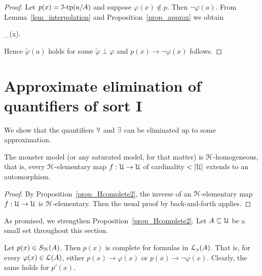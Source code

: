 \documentclass[10pt,oneside]{amsproc}
\begin{document}
 \begin{proof}
  Let $p(x)={\EuScript I}\mbox{-tp}(a/A)$ and suppose $\varphi(x)\notin p$.
  Then $\neg\varphi(a)$.
  From Lemma~\ref{lem_interpolation} and Proposition~\ref{prop_approx} we obtain

  {\rightarrow}
  {\bigvee_{\tilde{\varphi}\perp\varphi}\tilde{\varphi}(x).}

  Hence $\tilde{\varphi}(a)$ holds for some $\tilde{\varphi}\perp\varphi$ and $p(x)\rightarrow\neg\varphi(x)$ follows.
 \end{proof}








\section{Approximate elimination of quantifiers of sort \textsf{I}}

We show that the quantifiers $\forall $ and $\exists $ can be eliminated up to some approximation.

\begin{proposition}
  The monster model (or any saturated model, for that matter) is ${\EuScript H}$-homogeneous, that is, every ${\EuScript H}$-elementary map $f:{\EuScript U}\to{\EuScript U}$ of cardinality $<|{\EuScript  U}|$ extends to an automorphism.
\end{proposition}

\begin{proof}
  By Proposition~\ref{prop_Hcomplete2}, the inverse of an ${\EuScript H}$-elementary map $f:{\EuScript U}\to{\EuScript U}$ is ${\EuScript H}$-elementary.
  Then the usual proof by back-and-forth applies.
\end{proof}

As promised, we strengthen Proposition~\ref{prop_Hcomplete2}.
Let $A\subseteq{\EuScript U}$ be a small set throughout this section.

\begin{corollary}\label{corol_Lcomplete}
  Let $p(x)\in S_{\EuScript H}(A)$.
  Then $p(x)$ is complete for formulas in ${\EuScript L}_x(A)$.
  That is, for every $\varphi(x)\in{\EuScript L}(A)$, either $p(x)\rightarrow\varphi(x)$ or $p(x)\rightarrow\neg\varphi(x)$.
  Clearly, the same holds for $p'(x)$.
\end{corollary}
\end{document}
